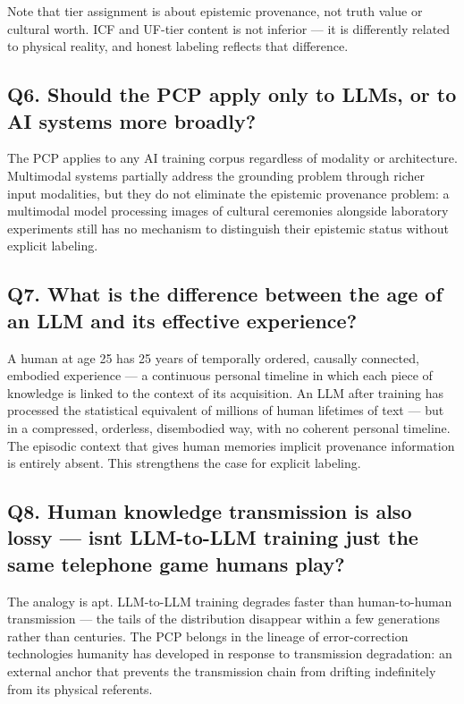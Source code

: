 \documentclass[12pt]{article}
\begin{document}
Note that tier assignment is about epistemic provenance, not truth value
or cultural worth. ICF and UF-tier content is not inferior --- it is
differently related to physical reality, and honest labeling reflects
that difference.

\subsection{Q6. Should the PCP apply only to LLMs, or to AI systems more
broadly?}\label{q6.-should-the-pcp-apply-only-to-llms-or-to-ai-systems-more-broadly}

The PCP applies to any AI training corpus regardless of modality or
architecture. Multimodal systems partially address the grounding problem
through richer input modalities, but they do not eliminate the epistemic
provenance problem: a multimodal model processing images of cultural
ceremonies alongside laboratory experiments still has no mechanism to
distinguish their epistemic status without explicit labeling.

\subsection{Q7. What is the difference between the age of an LLM and its
effective
experience?}\label{q7.-what-is-the-difference-between-the-age-of-an-llm-and-its-effective-experience}

A human at age 25 has 25 years of temporally ordered, causally
connected, embodied experience --- a continuous personal timeline in
which each piece of knowledge is linked to the context of its
acquisition. An LLM after training has processed the statistical
equivalent of millions of human lifetimes of text --- but in a
compressed, orderless, disembodied way, with no coherent personal
timeline. The episodic context that gives human memories implicit
provenance information is entirely absent. This strengthens the case for
explicit labeling.

\subsection{Q8. Human knowledge transmission is also lossy ---
isn\textquotesingle t LLM-to-LLM training just the same telephone game
humans
play?}\label{q8.-human-knowledge-transmission-is-also-lossy-isnt-llm-to-llm-training-just-the-same-telephone-game-humans-play}

The analogy is apt. LLM-to-LLM training degrades faster than
human-to-human transmission --- the tails of the distribution disappear
within a few generations rather than centuries. The PCP belongs in the
lineage of error-correction technologies humanity has developed in
response to transmission degradation: an external anchor that prevents
the transmission chain from drifting indefinitely from its physical
referents.
\end{document}
